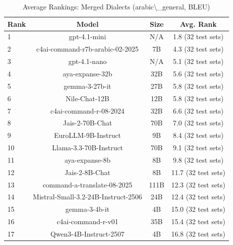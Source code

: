 \begin{table}[htbp]
\centering
\caption{Average Rankings: Merged Dialects (arabic\textbackslash{}_general, BLEU)}
\label{tab:avg_rankings_bleu_arabic_general}
\begin{tabular}{l@{\hspace{3pt}}c@{\hspace{3pt}}c@{\hspace{3pt}}c}
\toprule
Rank & Model & Size & Avg. Rank \\
\midrule
1 & gpt-4.1-mini & N/A & 1.8 (32 test sets) \\
2 & c4ai-command-r7b-arabic-02-2025 & 7B & 4.3 (32 test sets) \\
3 & gpt-4.1-nano & N/A & 5.1 (32 test sets) \\
4 & aya-expanse-32b & 32B & 5.6 (32 test sets) \\
5 & gemma-3-27b-it & 27B & 5.8 (32 test sets) \\
6 & Nile-Chat-12B & 12B & 5.8 (32 test sets) \\
7 & c4ai-command-r-08-2024 & 32B & 6.6 (32 test sets) \\
8 & Jais-2-70B-Chat & 70B & 7.0 (32 test sets) \\
9 & EuroLLM-9B-Instruct & 9B & 8.4 (32 test sets) \\
10 & Llama-3.3-70B-Instruct & 70B & 9.1 (32 test sets) \\
11 & aya-expanse-8b & 8B & 9.8 (32 test sets) \\
12 & Jais-2-8B-Chat & 8B & 11.7 (32 test sets) \\
13 & command-a-translate-08-2025 & 111B & 12.3 (32 test sets) \\
14 & Mistral-Small-3.2-24B-Instruct-2506 & 24B & 12.4 (32 test sets) \\
15 & gemma-3-4b-it & 4B & 15.0 (32 test sets) \\
16 & c4ai-command-r-v01 & 35B & 15.4 (32 test sets) \\
17 & Qwen3-4B-Instruct-2507 & 4B & 16.8 (32 test sets) \\
\bottomrule
\end{tabular}
\end{table}